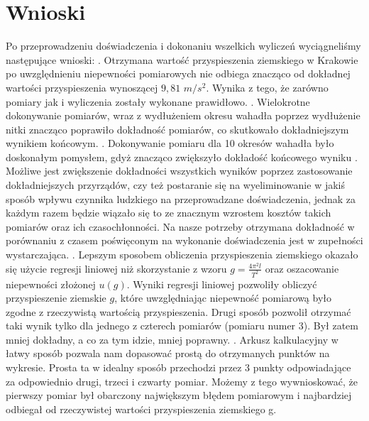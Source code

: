 \documentclass[12pt]{article}
\begin{document}
\section{Wnioski}
Po przeprowadzeniu doświadczenia i dokonaniu wszelkich wyliczeń wyciągneliśmy następujące wnioski: . Otrzymana wartość przyspieszenia ziemskiego w Krakowie po uwzględnieniu niepewności pomiarowych nie odbiega znacząco od dokładnej wartości przyspieszenia wynoszącej $ 9,81$ $m/s^2$. Wynika z tego, że zarówno pomiary jak i wyliczenia zostały wykonane prawidłowo. . Wielokrotne dokonywanie pomiarów, wraz z wydłużeniem okresu wahadła poprzez wydłużenie nitki znacząco poprawiło dokładność pomiarów, co skutkowało dokładniejszym wynikiem końcowym. . Dokonywanie pomiaru dla 10 okresów wahadła było doskonałym pomysłem, gdyż znacząco zwiększyło dokładość końcowego wyniku . Możliwe jest zwiększenie dokładności wszystkich wyników poprzez zastosowanie dokładniejszych przyrządów, czy też postaranie się na wyeliminowanie w jakiś sposób wpływu czynnika ludzkiego na przeprowadzane doświadczenia, jednak za każdym razem będzie wiązało się to ze znacznym wzrostem kosztów takich pomiarów oraz ich czasochłonności. Na nasze potrzeby otrzymana dokładność w porównaniu z czasem poświęconym na wykonanie doświadczenia jest w zupełności wystarczająca. . Lepszym sposobem obliczenia przyspieszenia ziemskiego okazało się użycie regresji liniowej niż skorzystanie z wzoru $ g = \frac{4{\pi^2}l}{T^2} $ oraz oszacowanie niepewności złożonej $u(g)$. Wyniki regresji liniowej pozwoliły obliczyć przyspieszenie ziemskie $g$, które uwzględniając niepewność pomiarową było zgodne z rzeczywistą wartością przyspieszenia. Drugi sposób pozwolił otrzymać taki wynik tylko dla jednego z czterech pomiarów (pomiaru numer 3). Był zatem mniej dokładny, a co za tym idzie, mniej poprawny.                  . Arkusz kalkulacyjny w łatwy sposób pozwala nam dopasować prostą do otrzymanych punktów na wykresie. Prosta ta w idealny sposób przechodzi przez 3 punkty odpowiadające za odpowiednio drugi, trzeci i czwarty pomiar. Możemy z tego wywnioskować, że pierwszy pomiar był obarczony największym błędem pomiarowym i najbardziej odbiegał od rzeczywistej wartości przyspieszenia ziemskiego g.
\end{document}
